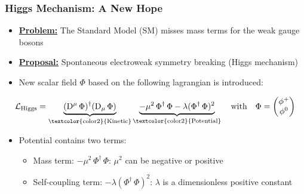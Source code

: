 \documentclass[xcolor={usenames,dvipsnames,svgnames,table}]{beamer}
\begin{document}
\begin{frame}
    \frametitle{Higgs Mechanism: A New Hope}
    \begin{itemize}
        \item \underline{\textbf{Problem:}} The Standard Model (SM) misses mass terms for the weak gauge bosons
        \item \underline{\textbf{Proposal:}} Spontaneous electroweak symmetry breaking (Higgs mechanism)
        \item New scalar field $\Phi$ based on the following lagrangian is introduced:
    \end{itemize}
    \begin{gather*}
        \label{eq_lagrangian_higgs}
        \mathcal{L}_\mathrm{Higgs} = \underbrace{(\mathrm{D}\xspace^\mu \, \Phi)^\dagger (\mathrm{D}\xspace_\mu \, \Phi)}_{\text{\textcolor{color2}{Kinetic}}} \underbrace{- \mu^2 \, \Phi^\dagger \, \Phi - \lambda {(\Phi^\dagger \, \Phi})^2}_{\text{\textcolor{color2}{Potential}}} \quad \text{with} \quad \Phi =  \begin{pmatrix} \phi^+ \\ \phi^0 \end{pmatrix}
    \end{gather*}
    \begin{itemize}
        \item \textcolor{color2}{Potential} contains two terms:
        \begin{itemize}
            \item Mass term: $- \mu^2 \, \Phi^\dagger \, \Phi $: $\mu^2$ can be negative or positive
            \item Self-coupling term: $- \lambda (\Phi^\dagger \, \Phi)^2$: $\lambda$ is a dimensionless positive constant
        \end{itemize}
    \end{itemize}
\end{frame}
\end{document}
